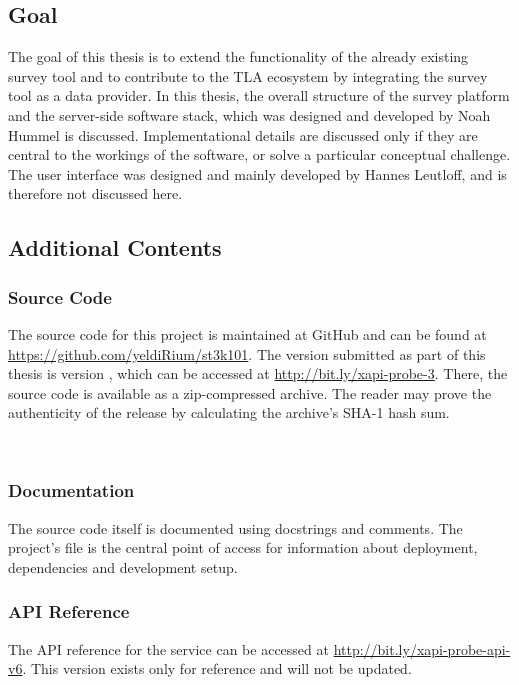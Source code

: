 \subsection{Goal}
    The goal of this thesis is to extend the functionality of the already existing
    survey tool and to contribute to the TLA ecosystem by integrating the
    survey tool as a data provider. In this thesis, the overall structure of the 
    survey platform and the server-side software stack, which was designed and developed 
    by Noah Hummel is discussed. Implementational details are discussed only 
    if they are central to the workings of the software, or solve a particular 
    conceptual challenge. The user interface was designed and mainly developed by 
    Hannes Leutloff, and is therefore not discussed here.

\subsection{Additional Contents}
\subsubsection{Source Code}
    The source code for this project is maintained at GitHub and can be found at
    \url{https://github.com/yeldiRium/st3k101}.
    The version submitted as part of this thesis is version , 
    which can be accessed at \url{http://bit.ly/xapi-probe-3}. There, the
    source code is available as a zip-compressed archive. The reader may
    prove the authenticity of the release by calculating the archive's
    SHA-1 hash sum. \\
     
     
    \\[1em]

\subsubsection{Documentation}
    The source code itself is documented using docstrings and comments.
    The project's  file is the central point of access
    for information about deployment, dependencies and development
    setup.

\subsubsection{API Reference}
    The API reference for the  service can be accessed
    at \url{http://bit.ly/xapi-probe-api-v6}. This version exists only
    for reference and will not be updated.